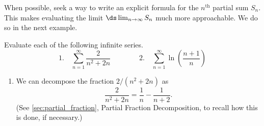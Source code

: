 When possible, seek a way to write an explicit formula for the $n^\text{th}$ partial sum $S_n$. This makes evaluating the limit $\ds\lim_{n\to\infty} S_n$ much more approachable. We do so in the next example.



\begin{example}\label{ex_series4}
Evaluate each of the following infinite series.
\[
 \text{1.}\quad\sum_{n=1}^\infty \frac{2}{n^2+2n}\qquad\qquad
 \text{2.}\quad\sum_{n=1}^\infty \ln\left(\frac{n+1}{n}\right)
\]
\solution
\begin{enumerate}
\item		We can decompose the fraction $2/(n^2+2n)$ as
\[\frac2{n^2+2n} = \frac1n-\frac1{n+2}.\]
(See \autoref{sec:partial_fraction}, Partial Fraction Decomposition, to recall how  this is done, if necessary.)


\end{enumerate}
\end{example}
